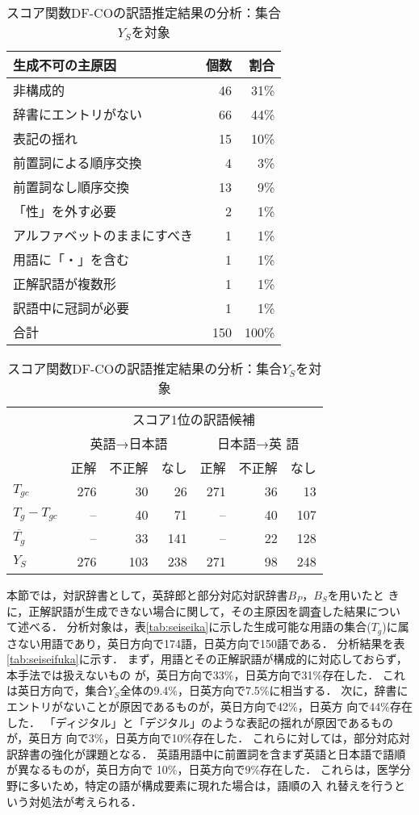 \documentclass[japanese]{jnlp_1.3a}
\begin{document}
\begin{table}[p]
 \begin{tabular}{|l|r|r|}
  \hline
  生成不可の主原因 & 個数 & 割合 \\
  \hline
  非構成的 & 46 & 31\%\\
  辞書にエントリがない & 66 & 44\%\\
  表記の揺れ & 15 & 10\%\\
  前置詞による順序交換 & 4 & 3\%\\
  前置詞なし順序交換 & 13 & 9\%\\
  「性」を外す必要 & 2 & 1\%\\
  アルファベットのままにすべき & 1 & 1\%\\
  用語に「・」を含む & 1 & 1\%\\
  正解訳語が複数形 & 1 & 1\%\\
  訳語中に冠詞が必要 & 1 & 1\%\\
  \hline
  合計 & 150 & 100\%\\
  \hline
 \end{tabular}
    \par\vspace{\baselineskip}
 \small
 \centering
 \caption{スコア関数DF-COの訳語推定結果の分析：集合$Y_{S}$を対象}
 \label{tab:DF-CO}
 \begin{tabular}{|l||r|r|r|r|r|r|}
  \hline
  & \multicolumn{6}{|c|}{スコア1位の訳語候補}\\
  \hhline{|~|---|---|}
  & \multicolumn{3}{|c|}{英語→日本語} & \multicolumn{3}{|c|}{日本語→英
  語}\\
  \hhline{|~|---|---|}
  & 正解 & 不正解 & なし & 正解 & 不正解 & なし\\
  \hline\hline
  $T_{gc}$            & 276 & 30 & 26 & 271 & 36& 13\\
  \hline
  $T_g-T_{gc}$        & --  & 40  & 71 & -- & 40  & 107\\
  \hline
  $\overline{T_g}$ & --  & 33  & 141 & -- & 22  & 128\\
  \hline\hline
  $Y_S$ & 276 & 103  & 238 & 271 & 98 & 248\\
  \hline
 \end{tabular}
\end{table}



本節では，対訳辞書として，英辞郎と部分対応対訳辞書$B_P$，$B_S$を用いたと
きに，正解訳語が生成できない場合に関して，その主原因を調査した結果につい
て述べる．
分析対象は，表\ref{tab:seiseika}に示した生成可能な用語の集合($T_g$)に属
さない用語であり，英日方向で174語，日英方向で150語である．
分析結果を表\ref{tab:seiseifuka}に示す．
まず，用語とその正解訳語が構成的に対応しておらず，本手法では扱えないもの
が，英日方向で33\%，日英方向で31\%存在した．
これは英日方向で，集合$Y_S$全体の9.4\%，日英方向で7.5\%に相当する．
次に，辞書にエントリがないことが原因であるものが，英日方向で42\%，日英方
向で44\%存在した．
「ディジタル」と「デジタル」のような表記の揺れが原因であるものが，英日方
向で3\%，日英方向で10\%存在した．
これらに対しては，部分対応対訳辞書の強化が課題となる．
英語用語中に前置詞を含まず英語と日本語で語順が異なるものが，英日方向で
10\%，日英方向で9\%存在した．
これらは，医学分野に多いため，特定の語が構成要素に現れた場合は，語順の入
れ替えを行うという対処法が考えられる．
\end{document}

